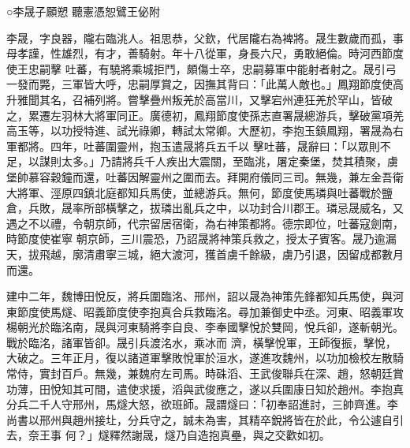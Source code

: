 
\begin{pinyinscope}

 ○李晟子願愬
 聽憲憑恕鷿王佖附



 李晟，字良器，隴右臨洮人。祖思恭，父欽，代居隴右為裨將。晟生數歲而孤，事母孝謹，性雄烈，有才，善騎射。年十八從軍，身長六尺，勇敢絕倫。時河西節度使王忠嗣擊
 吐蕃，有驍將乘城拒鬥，頗傷士卒，忠嗣募軍中能射者射之。晟引弓一發而斃，三軍皆大呼，忠嗣厚賞之，因撫其背曰：「此萬人敵也。」鳳翔節度使高升雅聞其名，召補列將。嘗擊疊州叛羌於高當川，又擊宕州連狂羌於罕山，皆破之，累遷左羽林大將軍同正。廣德初，鳳翔節度使孫志直署晟總游兵，擊破黨項羌高玉等，以功授特進、試光祿卿，轉試太常卿。大歷初，李抱玉鎮鳳翔，署晟為右軍都將。四年，吐蕃圍靈州，抱玉遣晟將兵五千以
 擊吐蕃，晟辭曰：「以眾則不足，以謀則太多。」乃請將兵千人疾出大震關，至臨洮，屠定秦堡，焚其積聚，虜堡帥慕容穀鐘而還，吐蕃因解靈州之圍而去。拜開府儀同三司。無幾，兼左金吾衛大將軍、涇原四鎮北庭都知兵馬使，並總游兵。無何，節度使馬璘與吐蕃戰於鹽倉，兵敗，晟率所部橫擊之，拔璘出亂兵之中，以功封合川郡王。璘忌晟威名，又遇之不以禮，令朝京師，代宗留居宿衛，為右神策都將。德宗即位，吐蕃寇劍南，時節度使崔寧
 朝京師，三川震恐，乃詔晟將神策兵救之，授太子賓客。晟乃逾漏天，拔飛越，廓清肅寧三城，絕大渡河，獲首虜千餘級，虜乃引退，因留成都數月而還。



 建中二年，魏博田悅反，將兵圍臨洺、邢州，詔以晟為神策先鋒都知兵馬使，與河東節度使馬燧、昭義節度使李抱真合兵救臨洺。尋加兼御史中丞。河東、昭義軍攻楊朝光於臨洺南，晟與河東騎將李自良、李奉國擊悅於雙岡，悅兵卻，遂斬朝光。戰於臨洺，諸軍皆卻。晟引兵渡洺水，乘冰而
 濟，橫擊悅軍，王師復振，擊悅，大破之。三年正月，復以諸道軍擊敗悅軍於洹水，遂進攻魏州，以功加檢校左散騎常侍，實封百戶。無幾，兼魏府左司馬。時硃滔、王武俊聯兵在深、趙，怒朝廷賞功薄，田悅知其可間，遣使求援，滔與武俊應之，遂以兵圍康日知於趙州。李抱真分兵二千人守邢州，馬燧大怒，欲班師。晟謂燧曰：「初奉詔進討，三帥齊進。李尚書以邢州與趙州接圵，分兵守之，誠未為害，其精卒銳將皆在於此，令公遽自引去，奈王事
 何？」燧釋然謝晟，燧乃自造抱真壘，與之交歡如初。




\end{pinyinscope}
